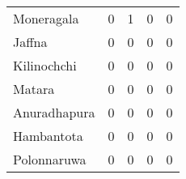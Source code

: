 \begin{tabular}{lrrrr}
Moneragala   &              0 &              1 &              0 &              0 \\
Jaffna       &              0 &              0 &              0 &              0 \\
Kilinochchi  &              0 &              0 &              0 &              0 \\
Matara       &              0 &              0 &              0 &              0 \\
Anuradhapura &              0 &              0 &              0 &              0 \\
Hambantota   &              0 &              0 &              0 &              0 \\
Polonnaruwa  &              0 &              0 &              0 &              0 \\
\bottomrule
\end{tabular}
